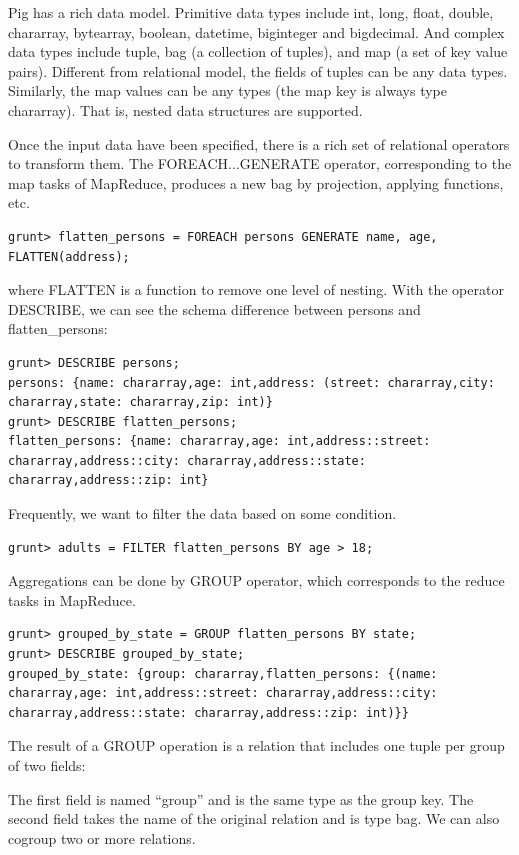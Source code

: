 \documentclass[12pt]{book}
\begin{document}
Pig has a rich data model. Primitive data types include int, long, float, double, chararray, bytearray, boolean, datetime, biginteger and bigdecimal. And complex data types include tuple, bag (a collection of tuples), and map (a set of key value pairs). Different from relational model, the fields of tuples can be any data types. Similarly, the map values can be any types (the map key is always type chararray). That is, nested data structures are supported.

Once the input data have been specified, there is a rich set of relational operators to transform them. The FOREACH...GENERATE operator, corresponding to the map tasks of MapReduce, produces a new bag by projection, applying functions, etc.

\begin{lstlisting}
grunt> flatten_persons = FOREACH persons GENERATE name, age, FLATTEN(address);
\end{lstlisting}
where FLATTEN is a function to remove one level of nesting. With the operator DESCRIBE, we can see the schema difference between persons and flatten\_persons:

\begin{lstlisting}
grunt> DESCRIBE persons;
persons: {name: chararray,age: int,address: (street: chararray,city: chararray,state: chararray,zip: int)}
grunt> DESCRIBE flatten_persons;
flatten_persons: {name: chararray,age: int,address::street: chararray,address::city: chararray,address::state: chararray,address::zip: int}
\end{lstlisting}
Frequently, we want to filter the data based on some condition.

\begin{lstlisting}
grunt> adults = FILTER flatten_persons BY age > 18;
\end{lstlisting}
Aggregations can be done by GROUP operator, which corresponds to the reduce tasks in MapReduce.

\begin{lstlisting}
grunt> grouped_by_state = GROUP flatten_persons BY state;
grunt> DESCRIBE grouped_by_state;
grouped_by_state: {group: chararray,flatten_persons: {(name: chararray,age: int,address::street: chararray,address::city: chararray,address::state: chararray,address::zip: int)}}
\end{lstlisting}
The result of a GROUP operation is a relation that includes one tuple per group of two fields:

The first field is named ``group'' and is the same type as the group key.
The second field takes the name of the original relation and is type bag.
We can also cogroup two or more relations.
\end{document}
